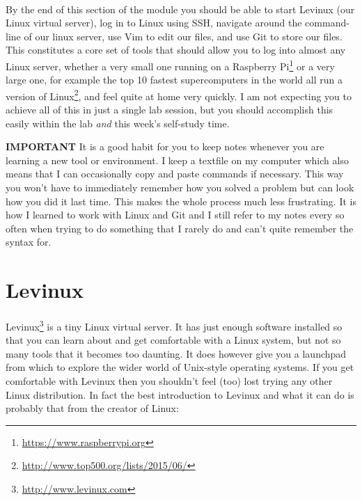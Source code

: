 \documentclass[12pt, a4paper, twoside]{book}
\begin{document}
\paragraph{} By the end of this section of the module you should be able to start Levinux (our Linux virtual server), log in to Linux using SSH, navigate around the command-line of our linux server, use Vim to edit our files, and use Git to store our files. This constitutes a core set of tools that should allow you to log into almost any Linux server, whether a very small one running on a Raspberry Pi\footnote{\url{https://www.raspberrypi.org}} or a very large one, for example the top 10 fastest supercomputers in the world all run a version of Linux\footnote{\url{http://www.top500.org/lists/2015/06/}}, and feel quite at home very quickly. I am not expecting you to achieve all of this in just a single lab session, but you should accomplish this easily within the lab \emph{and} this week's self-study time.

\begin{framed}
\textbf{IMPORTANT} It is a good habit for you to keep notes whenever you are learning a new tool or environment. I keep a textfile on my computer which also means that I can occasionally copy and paste commands if necessary. This way you won't have to immediately remember how you solved a problem but can look how you did it last time. This makes the whole process much less frustrating. It is how I learned to work with Linux and Git and I still refer to my notes every so often when trying to do something that I rarely do and can't quite remember the syntax for.
\end{framed}


\section{Levinux}
\label{levinux}
\paragraph{} Levinux\footnote{\url{http://www.levinux.com}} is a tiny Linux virtual server. It has just enough software installed so that you can learn about and get comfortable with a Linux system, but not so many tools that it becomes too daunting. It does however give you a launchpad from which to explore the wider world of Unix-style operating systems. If you get comfortable with Levinux then you shouldn't feel (too) lost trying any other Linux distribution. In fact the best introduction to Levinux and what it can do is probably that from the creator of Linux:\\
\end{document}
